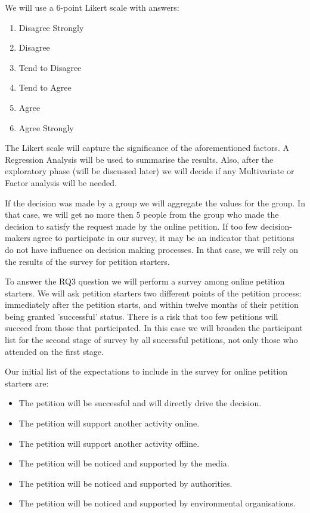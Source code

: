 We will use a 6-point Likert scale with answers:
\begin{enumerate}[start=0]
\item Disagree Strongly
\item Disagree
\item Tend to Disagree
\item Tend to Agree
\item Agree
\item Agree Strongly
\end{enumerate}

The Likert scale will capture the significance of the aforementioned factors. A Regression Analysis will be used to summarise the results. Also, after the exploratory phase (will be discussed later) we will decide if any Multivariate or Factor analysis will be needed.\par \vspace{0.2cm}

If the decision was made by a group we will aggregate the values for the group. In that case, we will get no more then 5 people from the group who made the decision to satisfy the request made by the online petition. If too few decision-makers agree to participate in our survey, it may be an indicator that petitions do not have influence on decision making processes. In that case, we will rely on the results of the survey for petition starters.\par\vspace{0.2cm}

To answer the RQ3 question we will perform a survey among online petition starters. We will ask petition starters two different points of the petition process: immediately after the petition starts, and within twelve months of their petition being granted 'successful' status. There is a risk that too few petitions will succeed from those that participated. In this case we will broaden the participant list for the second stage of survey by all successful petitions, not only those who attended on the first stage.\par\vspace{0.2cm}

Our initial list of the expectations to include in the survey for online petition starters are:

\begin{itemize}
\item The petition will be successful and will directly drive the decision.
\item The petition will support another activity online.
\item The petition will support another activity offline.
\item The petition will be noticed and supported by the media.
\item The petition will be noticed and supported by authorities.
\item The petition will be noticed and supported by environmental organisations.
\end{itemize}


